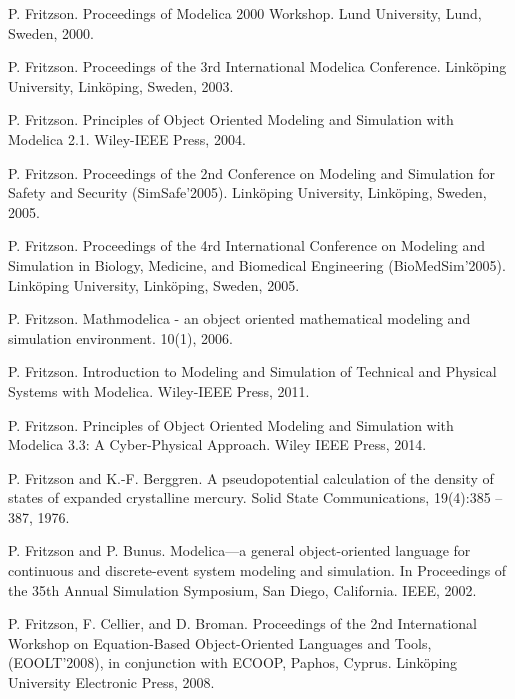 \begin{description}[style=nextline,leftmargin=12mm,labelwidth=10mm,font=\normalfont]
\item[{[105]}] P. Fritzson. Proceedings of Modelica 2000 Workshop. Lund University, Lund, Sweden, 2000.

\item[{[106]}] P. Fritzson. Proceedings of the 3rd International Modelica Conference. Linköping University, Linköping, Sweden, 2003.

\item[{[107]}] P. Fritzson. Principles of Object Oriented Modeling and Simulation with Modelica 2.1. Wiley-IEEE Press, 2004.

\item[{[108]}] P. Fritzson. Proceedings of the 2nd Conference on Modeling and Simulation for Safety and Security (SimSafe’2005). Linköping University, Linköping, Sweden, 2005.

\item[{[109]}] P. Fritzson. Proceedings of the 4rd International Conference on Modeling and Simulation in Biology, Medicine, and Biomedical Engineering (BioMedSim’2005). Linköping University, Linköping, Sweden, 2005.

\item[{[110]}] P. Fritzson. Mathmodelica - an object oriented mathematical modeling and simulation environment. 10(1), 2006.

\item[{[111]}] P. Fritzson. Introduction to Modeling and Simulation of Technical and Physical Systems with Modelica. Wiley-IEEE Press, 2011.

\item[{[112]}] P. Fritzson. Principles of Object Oriented Modeling and Simulation with Modelica 3.3: A Cyber-Physical Approach. Wiley IEEE Press, 2014.

\item[{[113]}] P. Fritzson and K.-F. Berggren. A pseudopotential calculation of the density of states of expanded crystalline mercury. Solid State Communications, 19(4):385 – 387, 1976.

\item[{[114]}] P. Fritzson and P. Bunus. Modelica—a general object-oriented language for continuous and discrete-event system modeling and simulation. In Proceedings of the 35th Annual Simulation Symposium, San Diego, California. IEEE, 2002.

\item[{[115]}] P. Fritzson, F. Cellier, and D. Broman. Proceedings of the 2nd International Workshop on Equation-Based Object-Oriented Languages and Tools, (EOOLT’2008), in conjunction with ECOOP, Paphos, Cyprus. Linköping University Electronic Press, 2008.


\end{description}
